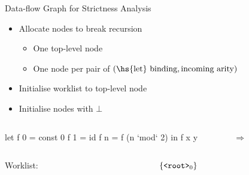 \documentclass{haskellbeamer}
\begin{document}
\begin{frame}[fragile]{Data-flow Graph for Strictness Analysis}
  \begin{itemize}
    \item Allocate nodes to break recursion
      \begin{itemize}
        \item One top-level node
        \item One node per pair of $(\text{\hs{let} binding}, \text{incoming arity})$
      \end{itemize}
    \item Initialise worklist to top-level node
    \item Initialise nodes with $\bot$
  \end{itemize}
  \begin{overprint}
    \begin{columns}
      \begin{column}{0.35\textwidth}
        \begin{haskell}
          let f 0 = const 0
              f 1 = id 
              f n = f (n `mod` 2)
          in f x y
        \end{haskell}
      \end{column}
      \begin{column}{0.02\textwidth}
        {\Huge$\Rightarrow$}
      \end{column}
      \begin{column}{0.4\textwidth}
      \end{column}
    \end{columns}
    \begin{columns}
      \begin{column}{0.55\textwidth}
        \hfill Worklist:
      \end{column}
      \begin{column}{0.55\textwidth}
        $\{\text{$\text{\texttt{<root>}}_{0}$}\}$ \hfill
      \end{column}
    \end{columns}
  \end{overprint}
\end{frame}
\end{document}
